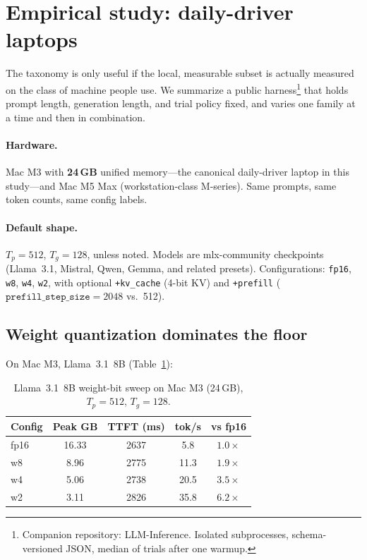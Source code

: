 \section{Empirical study: daily-driver laptops}
\label{sec:empirical}

The taxonomy is only useful if the local, measurable subset is actually measured on the class of machine people use. We summarize a public harness\footnote{Companion repository: LLM-Inference. Isolated subprocesses, schema-versioned JSON, median of trials after one warmup.} that holds prompt length, generation length, and trial policy fixed, and varies one family at a time and then in combination.

\paragraph{Hardware.}
Mac M3 with \textbf{24\,GB} unified memory---the canonical daily-driver laptop in this study---and Mac M5 Max (workstation-class M-series). Same prompts, same token counts, same config labels.

\paragraph{Default shape.}
\(T_p=512\), \(T_g=128\), unless noted. Models are mlx-community checkpoints (Llama~3.1, Mistral, Qwen, Gemma, and related presets). Configurations: \texttt{fp16}, \texttt{w8}, \texttt{w4}, \texttt{w2}, with optional \texttt{+kv\_cache} (4-bit KV) and \texttt{+prefill} (\(\texttt{prefill\_step\_size}=2048\) vs.\ 512).

\subsection{Weight quantization dominates the floor}

On Mac M3, Llama~3.1~8B (Table~\ref{tab:bits}):

\begin{table}[t]
  \centering
  \small
  \caption{Llama~3.1~8B weight-bit sweep on Mac M3 (24\,GB), \(T_p=512\), \(T_g=128\).}
  \label{tab:bits}
  \begin{tabular}{@{}lcccc@{}}
    \toprule
    Config & Peak GB & TTFT (ms) & tok/s & vs fp16 \\
    \midrule
    fp16 & 16.33 & 2637 & 5.8 & \(1.0\times\) \\
    w8 & 8.96 & 2775 & 11.3 & \(1.9\times\) \\
    w4 & 5.06 & 2738 & 20.5 & \(3.5\times\) \\
    w2 & 3.11 & 2826 & 35.8 & \(6.2\times\) \\
    \bottomrule
  \end{tabular}
\end{table}

